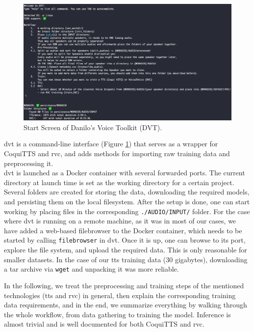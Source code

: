 \documentclass[
  a4paper,  %
  twoside,  %
  bibliography=totoc,
  headsepline,
  cleardoublepage=empty,
  parskip=half,
  draft=false
]{scrbook}
\begin{document}
\begin{figure}[h]
  \centering
  \includegraphics[width=1\textwidth]{./graphics/dvt-screen.png}
  \caption{Start Screen of Danilo's Voice Toolkit (DVT).}
  \label{fig:dvt-interface}
\end{figure}

\gls{dvt} is a command-line interface (Figure \ref{fig:dvt-interface}) that serves as a wrapper for CoquiTTS and \gls{rvc}, and adds methods for importing raw training data and preprocessing it. \\
\gls{dvt} is launched as a Docker container with several forwarded ports. The current directory at launch time is set as the working directory for a certain project. Several folders are created for storing the data, downloading the required models, and persisting them on the local filesystem. After the setup is done, one can start working by placing files in the corresponding \verb|./AUDIO/INPUT/| folder. For the case where \gls{dvt} is running on a remote machine, as it was in most of our cases, we have added a web-based filebrowser to the Docker container, which needs to be started by calling \verb|filebrowser| in \gls{dvt}. Once it is up, one can browse to its port, explore the file system, and upload the required data. This is only reasonable for smaller datasets. In the case of our \gls{tts} training data (30 gigabytes), downloading a tar archive via \verb|wget| and unpacking it was more reliable. 

In the following, we treat the preprocessing and training steps of the mentioned technologies (\gls{tts} and \gls{rvc}) in general, then explain the corresponding training data requirements, and in the end, we summarize everything by walking through the whole workflow, from data gathering to training the model. Inference is almost trivial and is well documented for both CoquiTTS and \gls{rvc}.
\end{document}
